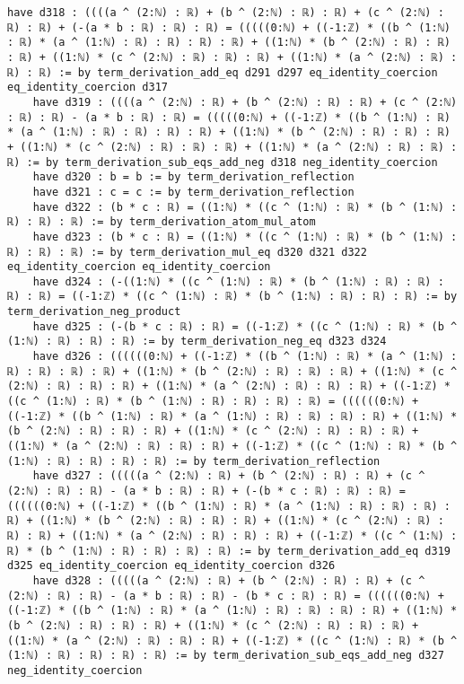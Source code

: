 \documentclass{article}
\begin{document}
\begin{tcolorbox}[colback=white!10, width=\linewidth]
\begin{lstlisting}[language=Lean4]
    have d318 : ((((a ^ (2:ℕ) : ℝ) + (b ^ (2:ℕ) : ℝ) : ℝ) + (c ^ (2:ℕ) : ℝ) : ℝ) + (-(a * b : ℝ) : ℝ) : ℝ) = (((((0:ℕ) + ((-1:ℤ) * ((b ^ (1:ℕ) : ℝ) * (a ^ (1:ℕ) : ℝ) : ℝ) : ℝ) : ℝ) + ((1:ℕ) * (b ^ (2:ℕ) : ℝ) : ℝ) : ℝ) + ((1:ℕ) * (c ^ (2:ℕ) : ℝ) : ℝ) : ℝ) + ((1:ℕ) * (a ^ (2:ℕ) : ℝ) : ℝ) : ℝ) := by term_derivation_add_eq d291 d297 eq_identity_coercion eq_identity_coercion d317
    have d319 : ((((a ^ (2:ℕ) : ℝ) + (b ^ (2:ℕ) : ℝ) : ℝ) + (c ^ (2:ℕ) : ℝ) : ℝ) - (a * b : ℝ) : ℝ) = (((((0:ℕ) + ((-1:ℤ) * ((b ^ (1:ℕ) : ℝ) * (a ^ (1:ℕ) : ℝ) : ℝ) : ℝ) : ℝ) + ((1:ℕ) * (b ^ (2:ℕ) : ℝ) : ℝ) : ℝ) + ((1:ℕ) * (c ^ (2:ℕ) : ℝ) : ℝ) : ℝ) + ((1:ℕ) * (a ^ (2:ℕ) : ℝ) : ℝ) : ℝ) := by term_derivation_sub_eqs_add_neg d318 neg_identity_coercion
    have d320 : b = b := by term_derivation_reflection
    have d321 : c = c := by term_derivation_reflection
    have d322 : (b * c : ℝ) = ((1:ℕ) * ((c ^ (1:ℕ) : ℝ) * (b ^ (1:ℕ) : ℝ) : ℝ) : ℝ) := by term_derivation_atom_mul_atom
    have d323 : (b * c : ℝ) = ((1:ℕ) * ((c ^ (1:ℕ) : ℝ) * (b ^ (1:ℕ) : ℝ) : ℝ) : ℝ) := by term_derivation_mul_eq d320 d321 d322 eq_identity_coercion eq_identity_coercion
    have d324 : (-((1:ℕ) * ((c ^ (1:ℕ) : ℝ) * (b ^ (1:ℕ) : ℝ) : ℝ) : ℝ) : ℝ) = ((-1:ℤ) * ((c ^ (1:ℕ) : ℝ) * (b ^ (1:ℕ) : ℝ) : ℝ) : ℝ) := by term_derivation_neg_product
    have d325 : (-(b * c : ℝ) : ℝ) = ((-1:ℤ) * ((c ^ (1:ℕ) : ℝ) * (b ^ (1:ℕ) : ℝ) : ℝ) : ℝ) := by term_derivation_neg_eq d323 d324
    have d326 : ((((((0:ℕ) + ((-1:ℤ) * ((b ^ (1:ℕ) : ℝ) * (a ^ (1:ℕ) : ℝ) : ℝ) : ℝ) : ℝ) + ((1:ℕ) * (b ^ (2:ℕ) : ℝ) : ℝ) : ℝ) + ((1:ℕ) * (c ^ (2:ℕ) : ℝ) : ℝ) : ℝ) + ((1:ℕ) * (a ^ (2:ℕ) : ℝ) : ℝ) : ℝ) + ((-1:ℤ) * ((c ^ (1:ℕ) : ℝ) * (b ^ (1:ℕ) : ℝ) : ℝ) : ℝ) : ℝ) = ((((((0:ℕ) + ((-1:ℤ) * ((b ^ (1:ℕ) : ℝ) * (a ^ (1:ℕ) : ℝ) : ℝ) : ℝ) : ℝ) + ((1:ℕ) * (b ^ (2:ℕ) : ℝ) : ℝ) : ℝ) + ((1:ℕ) * (c ^ (2:ℕ) : ℝ) : ℝ) : ℝ) + ((1:ℕ) * (a ^ (2:ℕ) : ℝ) : ℝ) : ℝ) + ((-1:ℤ) * ((c ^ (1:ℕ) : ℝ) * (b ^ (1:ℕ) : ℝ) : ℝ) : ℝ) : ℝ) := by term_derivation_reflection
    have d327 : (((((a ^ (2:ℕ) : ℝ) + (b ^ (2:ℕ) : ℝ) : ℝ) + (c ^ (2:ℕ) : ℝ) : ℝ) - (a * b : ℝ) : ℝ) + (-(b * c : ℝ) : ℝ) : ℝ) = ((((((0:ℕ) + ((-1:ℤ) * ((b ^ (1:ℕ) : ℝ) * (a ^ (1:ℕ) : ℝ) : ℝ) : ℝ) : ℝ) + ((1:ℕ) * (b ^ (2:ℕ) : ℝ) : ℝ) : ℝ) + ((1:ℕ) * (c ^ (2:ℕ) : ℝ) : ℝ) : ℝ) + ((1:ℕ) * (a ^ (2:ℕ) : ℝ) : ℝ) : ℝ) + ((-1:ℤ) * ((c ^ (1:ℕ) : ℝ) * (b ^ (1:ℕ) : ℝ) : ℝ) : ℝ) : ℝ) := by term_derivation_add_eq d319 d325 eq_identity_coercion eq_identity_coercion d326
    have d328 : (((((a ^ (2:ℕ) : ℝ) + (b ^ (2:ℕ) : ℝ) : ℝ) + (c ^ (2:ℕ) : ℝ) : ℝ) - (a * b : ℝ) : ℝ) - (b * c : ℝ) : ℝ) = ((((((0:ℕ) + ((-1:ℤ) * ((b ^ (1:ℕ) : ℝ) * (a ^ (1:ℕ) : ℝ) : ℝ) : ℝ) : ℝ) + ((1:ℕ) * (b ^ (2:ℕ) : ℝ) : ℝ) : ℝ) + ((1:ℕ) * (c ^ (2:ℕ) : ℝ) : ℝ) : ℝ) + ((1:ℕ) * (a ^ (2:ℕ) : ℝ) : ℝ) : ℝ) + ((-1:ℤ) * ((c ^ (1:ℕ) : ℝ) * (b ^ (1:ℕ) : ℝ) : ℝ) : ℝ) : ℝ) := by term_derivation_sub_eqs_add_neg d327 neg_identity_coercion

\end{lstlisting}
\end{tcolorbox}
\end{document}
